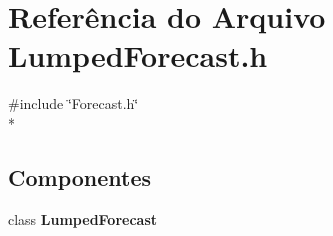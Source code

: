 \section{Referência do Arquivo Lumped\+Forecast.\+h}
\label{_lumped_forecast_8h}
{\ttfamily \#include \char`\"{}Forecast.\+h\char`\"{}}\\*
\subsection*{Componentes}
\begin{DoxyCompactItemize}
\item 
class {\bf Lumped\+Forecast}
\end{DoxyCompactItemize}
